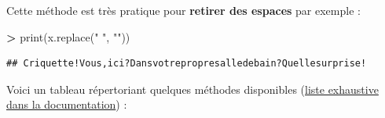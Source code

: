 \documentclass[12pt,]{book}
\newenvironment{Shaded}{\begin{snugshade}}{\end{snugshade}}
\newcommand{\StringTok}[1]{\textcolor[rgb]{0.31,0.60,0.02}{#1}}
\newcommand{\OperatorTok}[1]{\textcolor[rgb]{0.81,0.36,0.00}{\textbf{#1}}}
\newcommand{\BuiltInTok}[1]{#1}
\newcommand{\NormalTok}[1]{#1}
\numberwithin{equation}{section}
\numberwithin{countremarque}{section}
\begin{document}
Cette méthode est très pratique pour \textbf{retirer des espaces} par
exemple :

\begin{Shaded}
\begin{Highlighting}[]
\OperatorTok{>} \BuiltInTok{print}\NormalTok{(x.replace(}\StringTok{" "}\NormalTok{, }\StringTok{""}\NormalTok{))}
\end{Highlighting}
\end{Shaded}

\begin{lstlisting}
## Criquette!Vous,ici?Dansvotrepropresalledebain?Quellesurprise!
\end{lstlisting}

Voici un tableau répertoriant quelques méthodes disponibles
(\href{https://docs.python.org/3/library/stdtypes.html\#string-methods}{liste
exhaustive dans la documentation}) :
\end{document}
